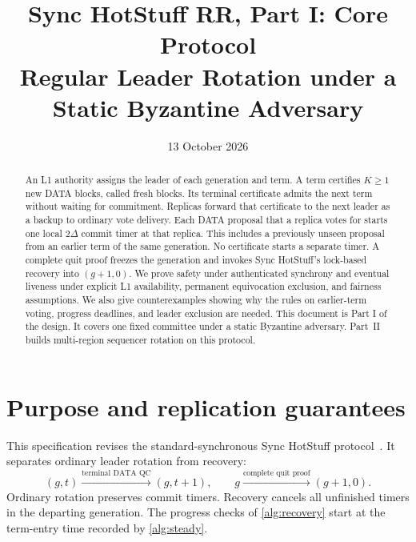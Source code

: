 \documentclass[11pt,a4paper]{article}
\title{Sync HotStuff RR, Part I: Core Protocol\\\large Regular Leader Rotation under a Static Byzantine Adversary}
\author{}\date{13 October 2026}
\newcounter{protocol}
\begin{document}
\maketitle
\begin{abstract}
An L1 authority assigns the leader of each generation and term.
A term certifies $K\ge1$ new DATA blocks, called fresh blocks. Its
terminal certificate admits the next term without waiting for commitment.
Replicas forward that certificate to the next leader as a backup to
ordinary vote delivery. Each DATA proposal that a replica votes for
starts one local $2\Delta$ commit timer at that replica. This includes a
previously unseen proposal from an earlier term of the same generation.
No certificate starts a separate timer. A complete quit proof freezes the
generation and invokes Sync HotStuff's lock-based recovery into $(g+1,0)$.
We prove safety under authenticated synchrony and eventual liveness under
explicit L1 availability, permanent equivocation exclusion, and fairness
assumptions. We also give counterexamples showing why the rules on
earlier-term voting, progress deadlines, and leader exclusion are needed.
This document is Part I of the design. It covers one fixed committee
under a static Byzantine adversary. Part~II~\cite{part2} builds
multi-region sequencer rotation on this protocol.
\end{abstract}

\section{Purpose and replication guarantees}
\label{sec:scope}
This specification revises the standard-synchronous Sync HotStuff
protocol~\cite{sync}. It separates ordinary leader rotation from recovery:
\[
 (g,t)\xrightarrow{\text{terminal DATA QC}}(g,t+1),
 \qquad
 g\xrightarrow{\text{complete quit proof}}(g+1,0).
\]
Ordinary rotation preserves commit timers. Recovery cancels all unfinished
timers in the departing generation. The progress checks of
\cref{alg:recovery} start at the term-entry time recorded by
\cref{alg:steady}.
\end{document}
